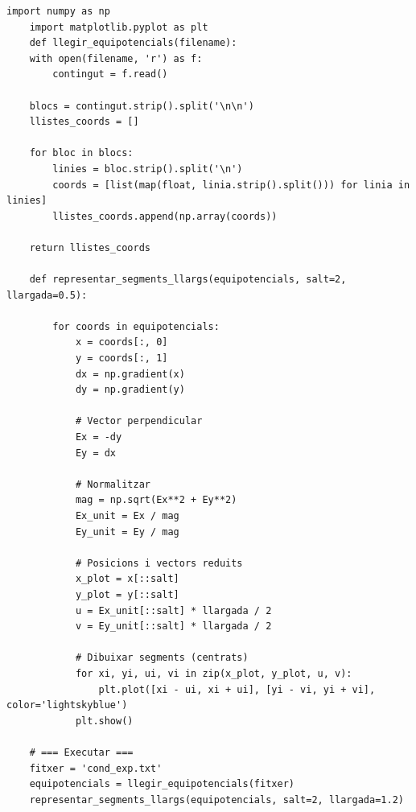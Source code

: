 \documentclass[11pt]{article}
\begin{document}
\begin{lstlisting}[caption={Camp elèctric experimental}, label={lst:exp_camp}]
    import numpy as np
    import matplotlib.pyplot as plt
    def llegir_equipotencials(filename):
    with open(filename, 'r') as f:
        contingut = f.read()

    blocs = contingut.strip().split('\n\n')
    llistes_coords = []

    for bloc in blocs:
        linies = bloc.strip().split('\n')
        coords = [list(map(float, linia.strip().split())) for linia in linies]
        llistes_coords.append(np.array(coords))

    return llistes_coords

    def representar_segments_llargs(equipotencials, salt=2, llargada=0.5):
        
        for coords in equipotencials:
            x = coords[:, 0]
            y = coords[:, 1]
            dx = np.gradient(x)
            dy = np.gradient(y)

            # Vector perpendicular
            Ex = -dy
            Ey = dx

            # Normalitzar
            mag = np.sqrt(Ex**2 + Ey**2)
            Ex_unit = Ex / mag
            Ey_unit = Ey / mag

            # Posicions i vectors reduits
            x_plot = x[::salt]
            y_plot = y[::salt]
            u = Ex_unit[::salt] * llargada / 2
            v = Ey_unit[::salt] * llargada / 2

            # Dibuixar segments (centrats)
            for xi, yi, ui, vi in zip(x_plot, y_plot, u, v):
                plt.plot([xi - ui, xi + ui], [yi - vi, yi + vi], color='lightskyblue')    
            plt.show()

    # === Executar ===
    fitxer = 'cond_exp.txt'
    equipotencials = llegir_equipotencials(fitxer)
    representar_segments_llargs(equipotencials, salt=2, llargada=1.2)
\end{lstlisting}
\end{document}
